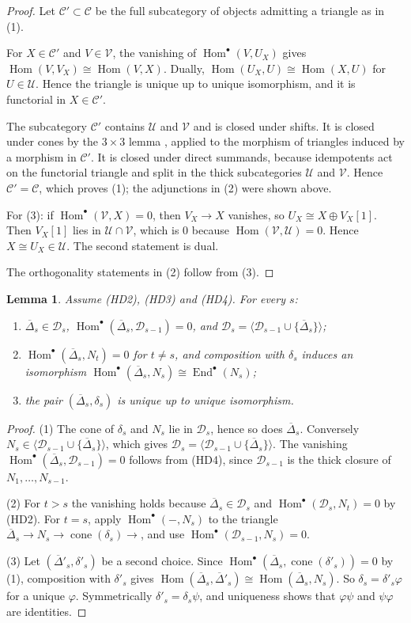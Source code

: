 \documentclass[11pt,reqno]{amsart}
\theoremstyle{plain}
\newtheorem{lemma}[theorem]{Lemma}
\theoremstyle{definition}
\theoremstyle{remark}
\DeclareMathOperator{\Hom}{Hom}
\DeclareMathOperator{\End}{End}
\DeclareMathOperator{\cone}{cone}
\newcommand{\thick}[1]{\langle #1\rangle}
\newcommand{\Deltabar}{\overline{\Delta}}
\newcommand{\cD}{\mathcal{D}}
\newcommand{\cC}{\mathcal{C}}
\newcommand{\cU}{\mathcal{U}}
\newcommand{\cV}{\mathcal{V}}
\begin{document}
\begin{proof}
Let $\cC'\subset\cC$ be the full subcategory of objects admitting a triangle as in (1).

For $X\in\cC'$ and $V\in\cV$, the vanishing of $\Hom^\bullet(V,U_X)$ gives $\Hom(V,V_X)\cong\Hom(V,X)$. Dually, $\Hom(U_X,U)\cong\Hom(X,U)$ for $U\in\cU$. Hence the triangle is unique up to unique isomorphism, and it is functorial in $X\in\cC'$.

The subcategory $\cC'$ contains $\cU$ and $\cV$ and is closed under shifts. It is closed under cones by the $3\times3$ lemma \cite[Prop.~1.1.11]{BBD82}, applied to the morphism of triangles induced by a morphism in $\cC'$. It is closed under direct summands, because idempotents act on the functorial triangle and split in the thick subcategories $\cU$ and $\cV$. Hence $\cC'=\cC$, which proves (1); the adjunctions in (2) were shown above.

For (3): if $\Hom^\bullet(\cV,X)=0$, then $V_X\to X$ vanishes, so $U_X\cong X\oplus V_X[1]$. Then $V_X[1]$ lies in $\cU\cap\cV$, which is $0$ because $\Hom(\cV,\cU)=0$. Hence $X\cong U_X\in\cU$. The second statement is dual.

The orthogonality statements in (2) follow from (3).
\end{proof}

\begin{lemma}\label{lem:right-dual}
Assume (HD2), (HD3) and (HD4). For every $s$:
\begin{enumerate}
\item $\Deltabar_s\in\cD_s$, $\Hom^\bullet(\Deltabar_s,\cD_{s-1})=0$, and $\cD_s=\thick{\cD_{s-1}\cup\{\Deltabar_s\}}$;
\item $\Hom^\bullet(\Deltabar_s,N_t)=0$ for $t\ne s$, and composition with $\delta_s$ induces an isomorphism $\Hom^\bullet(\Deltabar_s,N_s)\cong\End^\bullet(N_s)$;
\item the pair $(\Deltabar_s,\delta_s)$ is unique up to unique isomorphism.
\end{enumerate}
\end{lemma}

\begin{proof}
(1) The cone of $\delta_s$ and $N_s$ lie in $\cD_s$, hence so does $\Deltabar_s$. Conversely $N_s\in\thick{\cD_{s-1}\cup\{\Deltabar_s\}}$, which gives $\cD_s=\thick{\cD_{s-1}\cup\{\Deltabar_s\}}$. The vanishing $\Hom^\bullet(\Deltabar_s,\cD_{s-1})=0$ follows from (HD4), since $\cD_{s-1}$ is the thick closure of $N_1,\dots,N_{s-1}$.

(2) For $t>s$ the vanishing holds because $\Deltabar_s\in\cD_s$ and $\Hom^\bullet(\cD_s,N_t)=0$ by (HD2). For $t=s$, apply $\Hom^\bullet(-,N_s)$ to the triangle $\Deltabar_s\to N_s\to\cone(\delta_s)\to$, and use $\Hom^\bullet(\cD_{s-1},N_s)=0$.

(3) Let $(\Deltabar'_s,\delta'_s)$ be a second choice. Since $\Hom^\bullet(\Deltabar_s,\cone(\delta'_s))=0$ by (1), composition with $\delta'_s$ gives $\Hom(\Deltabar_s,\Deltabar'_s)\cong\Hom(\Deltabar_s,N_s)$. So $\delta_s=\delta'_s\varphi$ for a unique $\varphi$. Symmetrically $\delta'_s=\delta_s\psi$, and uniqueness shows that $\varphi\psi$ and $\psi\varphi$ are identities.
\end{proof}
\end{document}
